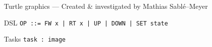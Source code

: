 \documentclass{beamer}
\begin{document}



  



\begin{frame}{Turtle graphics --- \small{Created \& investigated by Mathias
  Sablé--Meyer}}

  \begin{block}{DSL}
    \texttt{OP ::= FW x | RT x | UP | DOWN | SET state}
  \end{block}

  \begin{block}{Tasks}
    \texttt{task : image}
  \end{block}

  \vspace{0.2cm}


\end{frame}
\end{document}

